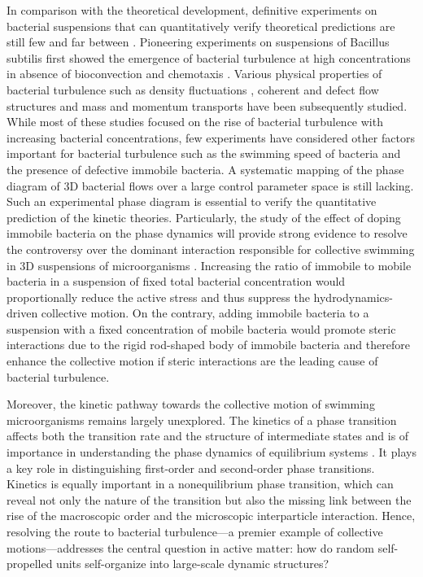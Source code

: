 In comparison with the theoretical development, definitive experiments on bacterial suspensions that can quantitatively verify theoretical predictions are still few and far between \cite{Koch2011, Saintillan2015}.
Pioneering experiments on suspensions of Bacillus subtilis first showed the emergence of bacterial turbulence at high concentrations in absence of bioconvection and chemotaxis \cite{Cisneros2011, Dombrowski2004, Cisneros2007, Sokolov2007, Sokolov2009}.
Various physical properties of bacterial turbulence such as density fluctuations \cite{Sokolov2009}, coherent and defect flow structures \cite{Sokolov2012, Ryan2013, Guo2018, Li2019} and mass and momentum transports \cite{Peng2016, Lopez2015, Liu2019, Yang2016} have been subsequently studied.
While most of these studies focused on the rise of bacterial turbulence with increasing bacterial concentrations, few experiments have considered other factors important for bacterial turbulence such as the swimming speed of bacteria \cite{Sokolov2012, Ryan2013} and the presence of defective immobile bacteria. A systematic mapping of the phase diagram of 3D bacterial flows over a large control parameter space is still lacking. Such an experimental phase diagram is essential to verify the quantitative prediction of the kinetic theories. Particularly, the study of the effect of doping immobile bacteria on the phase dynamics will provide strong evidence to resolve the controversy over the dominant interaction responsible for collective swimming in 3D suspensions of microorganisms \cite{Aranson2007, Ezhilan2013}. Increasing the ratio of immobile to mobile bacteria in a suspension of fixed total bacterial concentration would proportionally reduce the active stress and thus suppress the hydrodynamics-driven collective motion. On
the contrary, adding immobile bacteria to a suspension with a fixed concentration of mobile bacteria would promote steric interactions due to the rigid rod-shaped body of immobile bacteria and therefore enhance the collective motion if steric interactions are the leading cause of bacterial turbulence.

Moreover, the kinetic pathway towards the collective motion of swimming microorganisms remains largely unexplored. The kinetics of a phase transition affects both the transition rate and the structure of intermediate states and is of importance in understanding the phase dynamics of equilibrium systems \cite{Peng2015}. It plays a key role in distinguishing first-order and second-order phase transitions. Kinetics is equally important in a nonequilibrium phase transition, which can reveal not only the nature of the transition but also the missing link between the rise of the macroscopic order and the microscopic interparticle interaction. Hence, resolving the route to bacterial turbulence---a premier example of collective motions---addresses the central question in active matter: how do random self-propelled units self-organize into large-scale dynamic structures?

